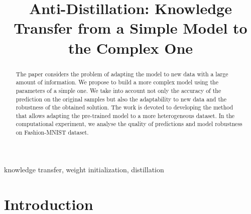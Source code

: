 \documentclass[conference]{IEEEtran}
\begin{document}
\title{Anti-Distillation: Knowledge Transfer from a Simple Model to the Complex One}

\author{
\and
{}
\and
{}
\and
{}
}

\maketitle

\begin{abstract}
	The paper considers the problem of adapting the model to new data with a large amount of information. We propose to build a more complex model using the parameters of a simple one. We take into account not only the accuracy of the prediction on the original samples but also the adaptability to new data and the robustness of the obtained solution. The work is devoted to developing the method that allows adapting the pre-trained model to a more heterogeneous dataset. In the computational experiment, we analyse the quality of predictions and model robustness on Fashion-MNIST dataset.
\end{abstract}

\begin{IEEEkeywords}
knowledge transfer, weight initialization, distillation
\end{IEEEkeywords}

\section{Introduction}
\end{document}
